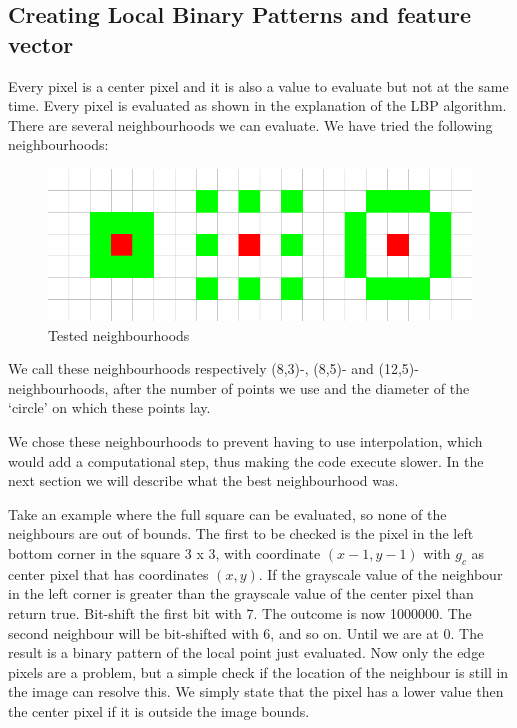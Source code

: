 \documentclass[a4paper]{article}
\begin{document}
\subsection{Creating Local Binary Patterns and feature vector}
Every pixel is a center pixel and it is also a value to evaluate but not at the
same time. Every pixel is evaluated as shown in the explanation
of the LBP algorithm. There are several neighbourhoods we can evaluate. We have
tried the following neighbourhoods:

\begin{figure}[H]
    \center
    \includegraphics[scale=0.5]{neighbourhoods.png}
    \caption{Tested neighbourhoods}
    \label{fig:tested-neighbourhoods}
\end{figure}

We call these neighbourhoods respectively (8,3)-, (8,5)- and
(12,5)-neighbourhoods, after the number of points we use and the diameter
of the `circle' on which these points lay.

We chose these neighbourhoods to prevent having to use interpolation, which
would add a computational step, thus making the code execute slower. In the
next section we will describe what the best neighbourhood was.

Take an example where the full square can be evaluated, so none of the
neighbours are out of bounds. The first to be checked is the pixel in the left
bottom corner in the square 3 x 3, with coordinate $(x - 1, y - 1)$ with $g_c$
as center pixel that has coordinates $(x, y)$. If the grayscale value of the
neighbour in the left corner is greater than the grayscale
value of the center pixel than return true. Bit-shift the first bit with 7. The
outcome is now 1000000. The second neighbour will be bit-shifted with 6, and so
on. Until we are at 0. The result is a binary pattern of the local point just
evaluated.
Now only the edge pixels are a problem, but a simple check if the location of
the neighbour is still in the image can resolve this. We simply state that the
pixel has a lower value then the center pixel if it is outside the image
bounds.
\end{document}
